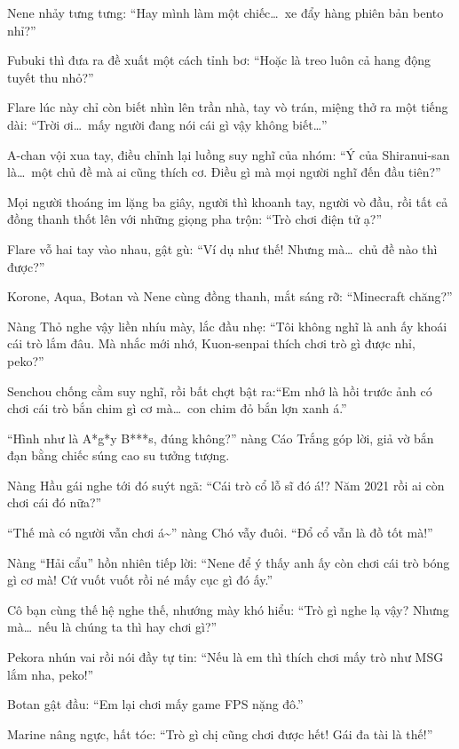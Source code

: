 \documentclass[../main.tex]{subfiles}
\begin{document}
Nene nhảy tưng tưng: ``Hay mình làm một chiếc\dots\ xe đẩy hàng phiên bản bento nhỉ?''

Fubuki thì đưa ra đề xuất một cách tỉnh bơ: ``Hoặc là treo luôn cả hang động tuyết thu nhỏ?''

Flare lúc này chỉ còn biết nhìn lên trần nhà, tay vò trán, miệng thở ra một tiếng dài: ``Trời ơi\dots\ mấy người đang nói cái gì vậy không biết\dots''

A-chan vội xua tay, điều chỉnh lại luồng suy nghĩ của nhóm: ``Ý của Shiranui-san là\dots\ một chủ đề mà ai cũng thích cơ. Điều gì mà mọi người nghĩ đến đầu tiên?''

Mọi người thoáng im lặng ba giây, người thì khoanh tay, người vò đầu, rồi tất cả đồng thanh thốt lên với những giọng pha trộn: ``Trò chơi điện tử ạ?''

Flare vỗ hai tay vào nhau, gật gù: ``Ví dụ như thế! Nhưng mà\dots\ chủ đề nào thì được?''

Korone, Aqua, Botan và Nene cùng đồng thanh, mắt sáng rỡ: ``Minecraft chăng?''

Nàng Thỏ nghe vậy liền nhíu mày, lắc đầu nhẹ: ``Tôi không nghĩ là anh ấy khoái cái trò lắm đâu. Mà nhắc mới nhớ, Kuon-senpai thích chơi trò gì được nhỉ, peko?''

Senchou chống cằm suy nghĩ, rồi bất chợt bật ra:``Em nhớ là hồi trước ảnh có chơi cái trò bắn chim gì cơ mà\dots\ con chim đỏ bắn lợn xanh á.''

``Hình như là A*g*y B***s, đúng không?'' nàng Cáo Trắng góp lời, giả vờ bắn đạn bằng chiếc súng cao su tưởng tượng.

Nàng Hầu gái nghe tới đó suýt ngã: ``Cái trò cổ lỗ sĩ đó á!? Năm 2021 rồi ai còn chơi cái đó nữa?''

``Thế mà có người vẫn chơi á\~{}'' nàng Chó vẫy đuôi. ``Đổ cổ vẫn là đồ tốt mà!''

Nàng ``Hải cẩu'' hồn nhiên tiếp lời: ``Nene để ý thấy anh ấy còn chơi cái trò bóng gì cơ mà! Cứ vuốt vuốt rồi né mấy cục gì đó ấy.''

Cô bạn cùng thế hệ nghe thế, nhướng mày khó hiểu: ``Trò gì nghe lạ vậy? Nhưng mà\dots\ nếu là chúng ta thì hay chơi gì?''

Pekora nhún vai rồi nói đầy tự tin: ``Nếu là em thì thích chơi mấy trò như MSG lắm nha, peko!''

Botan gật đầu: ``Em lại chơi mấy game FPS nặng đô.''

Marine nâng ngực, hất tóc: ``Trò gì chị cũng chơi được hết! Gái đa tài là thế!''
\end{document}
